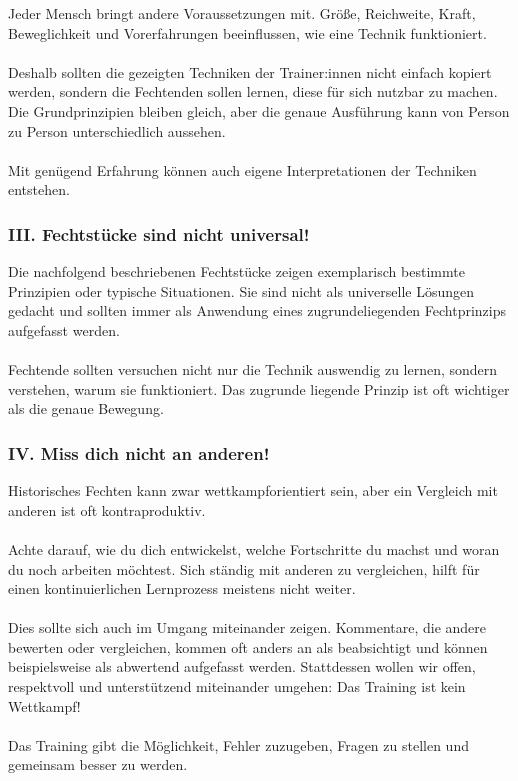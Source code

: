 Jeder Mensch bringt andere Voraussetzungen mit. Größe, Reichweite, Kraft, Beweglichkeit und Vorerfahrungen beeinflussen, wie eine Technik funktioniert.
\\
\\
Deshalb sollten die gezeigten Techniken der Trainer:innen nicht einfach kopiert werden, sondern die Fechtenden sollen lernen, diese für sich nutzbar zu machen. Die Grundprinzipien bleiben gleich, aber die genaue Ausführung kann von Person zu Person
unterschiedlich aussehen.
\\
\\
Mit genügend Erfahrung können auch eigene Interpretationen der Techniken entstehen.

\subsubsection*{III. Fechtstücke sind nicht universal!}

Die nachfolgend beschriebenen Fechtstücke zeigen exemplarisch bestimmte Prinzipien oder typische Situationen. Sie sind nicht als universelle Lösungen gedacht und sollten immer als Anwendung eines zugrundeliegenden Fechtprinzips aufgefasst werden.
\\
\\
Fechtende sollten versuchen nicht nur die Technik auswendig zu lernen, sondern verstehen, warum sie funktioniert. Das zugrunde liegende Prinzip ist oft wichtiger als die genaue Bewegung.

\subsubsection*{IV. Miss dich nicht an anderen!}

Historisches Fechten kann zwar wettkampforientiert sein, aber ein Vergleich mit anderen ist oft kontraproduktiv.
\\
\\
Achte darauf, wie du dich entwickelst, welche Fortschritte du machst und woran du noch arbeiten möchtest. Sich ständig mit anderen zu vergleichen, hilft für einen kontinuierlichen Lernprozess meistens nicht weiter.
\\
\\
Dies sollte sich auch im Umgang miteinander zeigen. Kommentare, die andere bewerten oder vergleichen, kommen oft anders an als beabsichtigt und können beispielsweise als abwertend aufgefasst werden. Stattdessen wollen wir offen, respektvoll und unterstützend miteinander umgehen: Das Training ist kein Wettkampf!
\\
\\
Das Training gibt die Möglichkeit, Fehler zuzugeben, Fragen zu stellen und gemeinsam besser zu werden.

